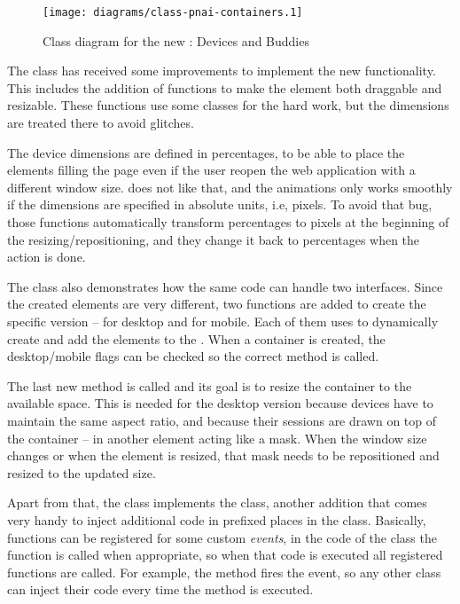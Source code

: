 \begin{figure}[htbp]
  \centering
    \texttt{[image: diagrams/class-pnai-containers.1]}
  \caption{Class diagram for the new : Devices and Buddies}
  \label{fig:class-pnai-containers}
\end{figure}

The  class has received some improvements to implement the new functionality.
This includes the addition of functions to make the  element both draggable and resizable.
These functions use some  classes for the hard work, but the dimensions are treated there to avoid  glitches.

The device dimensions are defined in percentages, to be able to place the elements filling the page even if the user reopen the web application with a different window size.
 does not like that, and the animations only works smoothly if the dimensions are specified in absolute units, i.e, pixels.
To avoid that bug, those functions automatically transform percentages to pixels at the beginning of the resizing/repositioning, and they change it back to percentages when the action is done.

The  class also demonstrates how the same code can handle two interfaces.
Since the created elements are very different, two functions are added to create the specific version --  for desktop and  for mobile.
Each of them uses  to dynamically create and add the elements to the .
When a container is created, the desktop/mobile flags can be checked so the correct method is called.

The last new method is called  and its goal is to resize the container to the available space.
This is needed for the desktop version because devices have to maintain the same aspect ratio, and because their sessions are drawn on top of the container -- in another element acting like a mask.
When the window size changes or when the element is resized, that mask needs to be repositioned and resized to the updated size.

Apart from that, the class implements the  class, another  addition that comes very handy to inject additional code in prefixed places in the class.
Basically, functions can be registered for some custom \emph{events}, in the code of the class the  function is called when appropriate, so when that code is executed all registered functions are called.
For example, the  method fires the  event, so any other class can inject their code every time the  method is executed.

